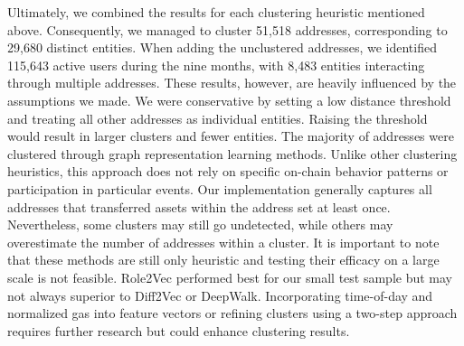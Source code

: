 \documentclass[12pt,a4paper,titlepage,oneside,english]{article}
\begin{document}
Ultimately, we combined the results for each clustering heuristic mentioned above. Consequently, we managed to cluster 51,518 addresses, corresponding to 29,680 distinct entities. When adding the unclustered addresses, we identified 115,643 active users during the nine months, with 8,483 entities interacting through multiple addresses. \newline
These results, however, are heavily influenced by the assumptions we made. We were conservative by setting a low distance threshold and treating all other addresses as individual entities. Raising the threshold would result in larger clusters and fewer entities. \newline 
The majority of addresses were clustered through graph representation learning methods. Unlike other clustering heuristics, this approach does not rely on specific on-chain behavior patterns or participation in particular events. Our implementation generally captures all addresses that transferred assets within the address set at least once. Nevertheless, some clusters may still go undetected, while others may overestimate the number of addresses within a cluster. It is important to note that these methods are still only heuristic and testing their efficacy on a large scale is not feasible. \newline
Role2Vec performed best for our small test sample but may not always superior to Diff2Vec or DeepWalk. Incorporating time-of-day and normalized gas into feature vectors or refining clusters using a two-step approach requires further research but could enhance clustering results.

\end{document}
